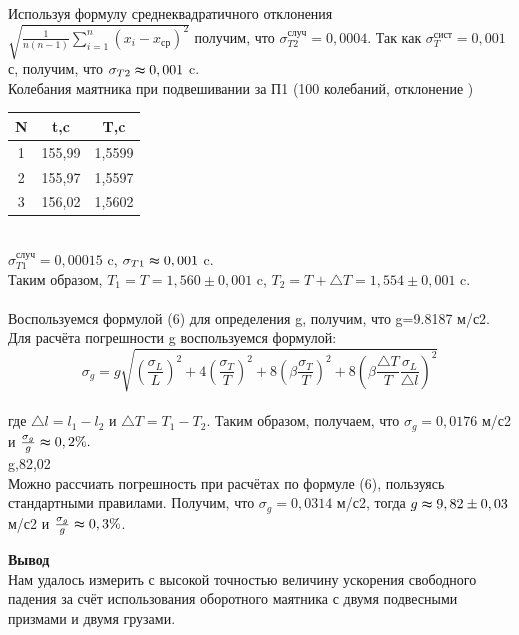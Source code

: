 \documentclass[12pt]{article}
\begin{document}
Используя формулу среднеквадратичного отклонения $\sqrt{\frac{1}{n(n-1)}\sum_{i=1}^n(x_{i}-x_{\text{ср}})^2}$ получим, что $\sigma_{T2}^{\text{случ}}=0,0004$. Так как $\sigma_{T}^{\text{сист}}=0,001$с, получим, что $\sigma_{T2}\thickapprox 0,001$ c.\\

Колебания маятника при подвешивании за П1 (100 колебаний, отклонение \degree)\\

\begin{tabular}{c|c|c}
N & t,c & T,c\\
\hline
 1 & 155,99 & 1,5599\\
 2 & 155,97 & 1,5597\\
 3 & 156,02 & 1,5602\\
\end{tabular}\\

$\sigma_{T1}^{\text{случ}}=0,00015$ c, $\sigma_{T1}\thickapprox 0,001$ c.\\

Таким образом, $T_{1}=T=1,560\pm 0,001$ c, $T_{2}=T+\triangle T= 1,554\pm 0,001$ c.\\

\textbf{\large {}}\\

Воспользуемся формулой (6) для определения g, получим, что g=9.8187 м/с2. Для расчёта погрешности g воспользуемся формулой:
$$\sigma_{g} =g\sqrt{(\frac{\sigma_{L}}{L})^2+4(\frac{\sigma_{T}}{T})^2+8(\beta\frac{\sigma_{T}}{T})^2+8(\beta\frac{\triangle T}{T}\frac{\sigma_{L}}{\triangle l})^2} $$\\

где $\triangle l=l_{1}-l_{2}$ и $\triangle T=T_{1}-T_{2}$. Таким образом, получаем, что $\sigma_{g} = 0,0176$ м/с2 и \large $\frac{\sigma_{g}}{g}  \thickapprox 0,2\%.$\\

g,82,02\;  \newpage\\

Можно рассчиать погрешность при расчётах по формуле (6), пользуясь стандартными правилами. Получим, что $\sigma_{g} = 0,0314$ м/с2, тогда $g\thickapprox9,82\pm0,03$ м/с2 и $\frac{\sigma_{g}}{g}\thickapprox0,3\%$.


\textbf{\large Вывод}\\

Нам удалось измерить с высокой точностью величину ускорения свободного падения за счёт использования оборотного маятника с двумя подвесными призмами и двумя грузами.
\end{document}
